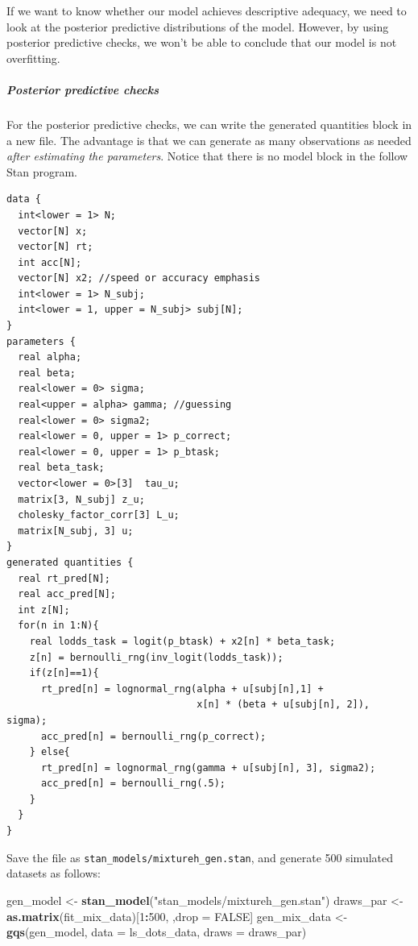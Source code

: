 \documentclass[12pt,]{krantz}
\newenvironment{Shaded}{\begin{snugshade}}{\end{snugshade}}
\newcommand{\DataTypeTok}[1]{\textcolor[rgb]{0.13,0.29,0.53}{#1}}
\newcommand{\DecValTok}[1]{\textcolor[rgb]{0.00,0.00,0.81}{#1}}
\newcommand{\KeywordTok}[1]{\textcolor[rgb]{0.13,0.29,0.53}{\textbf{#1}}}
\newcommand{\NormalTok}[1]{#1}
\newcommand{\OperatorTok}[1]{\textcolor[rgb]{0.81,0.36,0.00}{\textbf{#1}}}
\newcommand{\OtherTok}[1]{\textcolor[rgb]{0.56,0.35,0.01}{#1}}
\newcommand{\StringTok}[1]{\textcolor[rgb]{0.31,0.60,0.02}{#1}}
\let\oldsubparagraph\subparagraph
\renewcommand{\subparagraph}[1]{\oldsubparagraph{#1}\mbox{}}
\theoremstyle{definition}
\theoremstyle{definition}
\theoremstyle{definition}
\theoremstyle{remark}
\begin{document}
If we want to know whether our model achieves descriptive adequacy, we need to look at the posterior predictive distributions of the model. However, by using posterior predictive checks, we won't be able to conclude that our model is not overfitting.

\hypertarget{posterior-predictive-checks}{%
\subparagraph{Posterior predictive checks}\label{posterior-predictive-checks}}

For the posterior predictive checks, we can write the generated quantities block in a new file. The advantage is that we can generate as many observations as needed \emph{after estimating the parameters}. Notice that there is no model block in the follow Stan program.

\begin{verbatim}
data {
  int<lower = 1> N;
  vector[N] x;
  vector[N] rt;
  int acc[N];
  vector[N] x2; //speed or accuracy emphasis
  int<lower = 1> N_subj;
  int<lower = 1, upper = N_subj> subj[N];
}
parameters {
  real alpha;
  real beta;
  real<lower = 0> sigma;
  real<upper = alpha> gamma; //guessing
  real<lower = 0> sigma2;
  real<lower = 0, upper = 1> p_correct;
  real<lower = 0, upper = 1> p_btask;
  real beta_task;
  vector<lower = 0>[3]  tau_u;   
  matrix[3, N_subj] z_u;
  cholesky_factor_corr[3] L_u;
  matrix[N_subj, 3] u;
}
generated quantities {
  real rt_pred[N];
  real acc_pred[N];
  int z[N];
  for(n in 1:N){
    real lodds_task = logit(p_btask) + x2[n] * beta_task;
    z[n] = bernoulli_rng(inv_logit(lodds_task));
    if(z[n]==1){
      rt_pred[n] = lognormal_rng(alpha + u[subj[n],1] +
                                 x[n] * (beta + u[subj[n], 2]), sigma);
      acc_pred[n] = bernoulli_rng(p_correct);
    } else{
      rt_pred[n] = lognormal_rng(gamma + u[subj[n], 3], sigma2);
      acc_pred[n] = bernoulli_rng(.5);
    }
  }
}
\end{verbatim}

Save the file as \texttt{stan\_models/mixtureh\_gen.stan}, and generate 500 simulated datasets as follows:

\begin{Shaded}
\begin{Highlighting}[]
\NormalTok{gen_model <-}\StringTok{ }\KeywordTok{stan_model}\NormalTok{(}\StringTok{"stan_models/mixtureh_gen.stan"}\NormalTok{)}
\NormalTok{draws_par <-}\StringTok{ }\KeywordTok{as.matrix}\NormalTok{(fit_mix_data)[}\DecValTok{1}\OperatorTok{:}\DecValTok{500}\NormalTok{, ,drop =}\StringTok{ }\OtherTok{FALSE}\NormalTok{]}
\NormalTok{gen_mix_data <-}\StringTok{ }\KeywordTok{gqs}\NormalTok{(gen_model,}
                    \DataTypeTok{data =}\NormalTok{ ls_dots_data,}
                    \DataTypeTok{draws =}\NormalTok{ draws_par)}
\end{Highlighting}
\end{Shaded}
\end{document}

